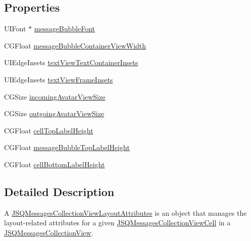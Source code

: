 \subsection*{Properties}
\begin{DoxyCompactItemize}
\item 
U\+I\+Font $\ast$ \hyperlink{interface_j_s_q_messages_collection_view_layout_attributes_a6bfdf3b5bf176f498a8e2656dda32065}{message\+Bubble\+Font}
\item 
C\+G\+Float \hyperlink{interface_j_s_q_messages_collection_view_layout_attributes_a03786a297a9365776ae46ec44a1acb1c}{message\+Bubble\+Container\+View\+Width}
\item 
U\+I\+Edge\+Insets \hyperlink{interface_j_s_q_messages_collection_view_layout_attributes_a3baa6c5c109e6a38be5c2008fe08292b}{text\+View\+Text\+Container\+Insets}
\item 
U\+I\+Edge\+Insets \hyperlink{interface_j_s_q_messages_collection_view_layout_attributes_aa39b84f61717c6f161cf38e7e3dfc169}{text\+View\+Frame\+Insets}
\item 
C\+G\+Size \hyperlink{interface_j_s_q_messages_collection_view_layout_attributes_a91bd3a2318e015c81ba2e5b9538a98f9}{incoming\+Avatar\+View\+Size}
\item 
C\+G\+Size \hyperlink{interface_j_s_q_messages_collection_view_layout_attributes_a91ee2dc3a373791c2e4d276d4b4248b1}{outgoing\+Avatar\+View\+Size}
\item 
C\+G\+Float \hyperlink{interface_j_s_q_messages_collection_view_layout_attributes_aeab741939de4098a9cae0234e6b49cc3}{cell\+Top\+Label\+Height}
\item 
C\+G\+Float \hyperlink{interface_j_s_q_messages_collection_view_layout_attributes_aa7cac487efd2cd332c50a33473110fe5}{message\+Bubble\+Top\+Label\+Height}
\item 
C\+G\+Float \hyperlink{interface_j_s_q_messages_collection_view_layout_attributes_aba6c02585ef9f6d6ce45a58aa178e949}{cell\+Bottom\+Label\+Height}
\end{DoxyCompactItemize}


\subsection{Detailed Description}
A {\ttfamily \hyperlink{interface_j_s_q_messages_collection_view_layout_attributes}{J\+S\+Q\+Messages\+Collection\+View\+Layout\+Attributes}} is an object that manages the layout-\/related attributes for a given {\ttfamily \hyperlink{interface_j_s_q_messages_collection_view_cell}{J\+S\+Q\+Messages\+Collection\+View\+Cell}} in a {\ttfamily \hyperlink{interface_j_s_q_messages_collection_view}{J\+S\+Q\+Messages\+Collection\+View}}. 

